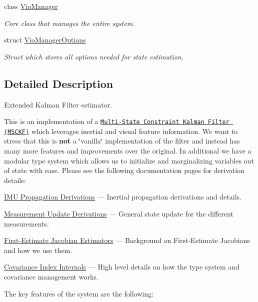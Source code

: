 \begin{DoxyCompactItemize}
class \hyperlink{classov__msckf_1_1VioManager}{Vio\+Manager}
\begin{DoxyCompactList}\small\item\em Core class that manages the entire system. \end{DoxyCompactList}\item 
struct \hyperlink{structov__msckf_1_1VioManagerOptions}{Vio\+Manager\+Options}
\begin{DoxyCompactList}\small\item\em Struct which stores all options needed for state estimation. \end{DoxyCompactList}\end{DoxyCompactItemize}


\subsection{Detailed Description}
Extended Kalman Filter estimator. 

This is an implementation of a \href{https://ieeexplore.ieee.org/document/4209642}{\tt Multi-\/\+State Constraint Kalman Filter (M\+S\+C\+KF)} \cite{Mourikis2007ICRA} which leverages inertial and visual feature information. We want to stress that this is {\bfseries not} a \char`\"{}vanilla\char`\"{} implementation of the filter and instead has many more features and improvements over the original. In additional we have a modular type system which allows us to initialize and marginalizing variables out of state with ease. Please see the following documentation pages for derivation details\+:


\begin{DoxyItemize}
\item \hyperlink{propagation}{I\+MU Propagation Derivations} --- Inertial propagation derivations and details.
\item \hyperlink{update}{Measurement Update Derivations} --- General state update for the different measurements.
\item \hyperlink{fej}{First-\/\+Estimate Jacobian Estimators} --- Background on First-\/\+Estimate Jacobians and how we use them.
\item \hyperlink{dev-index}{Covariance Index Internals} --- High level details on how the type system and covariance management works.
\end{DoxyItemize}

The key features of the system are the following\+:



